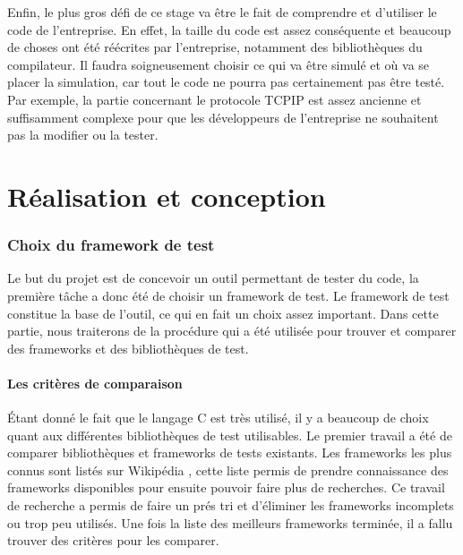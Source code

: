 \documentclass[a4paper]{article}
\begin{document}
Enfin, le plus gros défi de ce stage va être le fait de comprendre et d'utiliser
le code de l'entreprise. En effet, la taille du code est assez conséquente et
beaucoup de choses ont été réécrites par l'entreprise, notamment des
bibliothèques du compilateur. Il faudra soigneusement choisir ce qui va être
simulé et où va se placer la simulation, car tout le code ne pourra pas
certainement pas être testé. Par exemple, la partie concernant le protocole
TCPIP est assez ancienne et suffisamment complexe pour que les développeurs de
l'entreprise ne souhaitent pas la modifier ou la tester.
\clearpage
\part{Réalisation et conception}

\section{Choix du framework de test}%

Le but du projet est de concevoir un outil permettant de tester du code, la
première tâche a donc été de choisir un framework de test. Le framework de test
constitue la base de l'outil, ce qui en fait un choix assez important. Dans
cette partie, nous traiterons de la procédure qui a été utilisée pour trouver et
comparer des frameworks et des bibliothèques de test.

\subsection{Les critères de comparaison}%

Étant donné le fait que le langage C est très utilisé, il y a beaucoup de choix
quant aux différentes bibliothèques de test utilisables. Le premier travail a
été de comparer bibliothèques et frameworks de tests existants. Les frameworks
les plus connus sont listés sur Wikipédia \cite{enwikiframeworks}, cette liste
permis de prendre connaissance des frameworks disponibles pour ensuite pouvoir
faire plus de recherches. Ce travail de recherche a permis de faire un prés tri
et d'éliminer les frameworks incomplets ou trop peu utilisés. Une fois la liste
des meilleurs frameworks terminée, il a fallu trouver des critères pour les
comparer.\\
\end{document}

